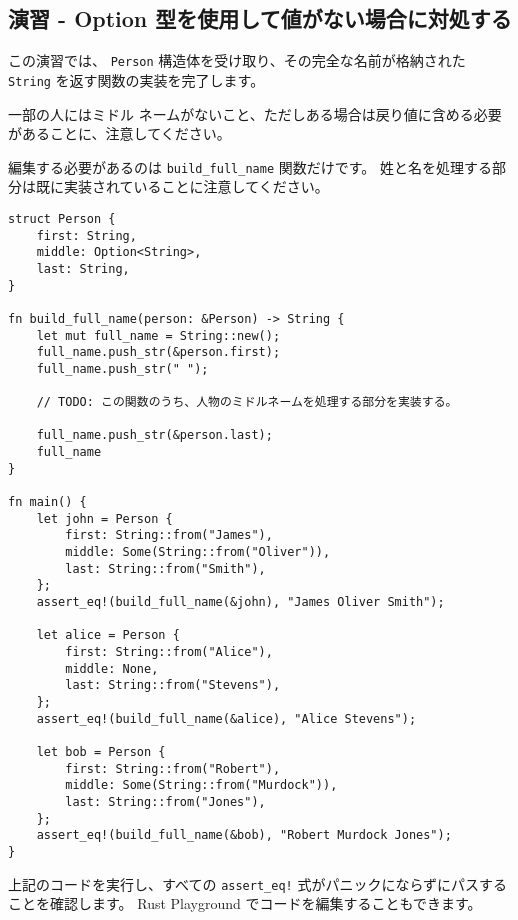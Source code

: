 \subsection{演習 - Option 型を使用して値がない場合に対処する}

この演習では、 \texttt{Person} 構造体を受け取り、その完全な名前が格納された \texttt{String} を返す関数の実装を完了します。

一部の人にはミドル ネームがないこと、ただしある場合は戻り値に含める必要があることに、注意してください。

編集する必要があるのは \texttt{build\_full\_name} 関数だけです。 姓と名を処理する部分は既に実装されていることに注意してください。

\begin{lstlisting}[numbers=none]
struct Person {
    first: String,
    middle: Option<String>,
    last: String,
}

fn build_full_name(person: &Person) -> String {
    let mut full_name = String::new();
    full_name.push_str(&person.first);
    full_name.push_str(" ");

    // TODO: この関数のうち、人物のミドルネームを処理する部分を実装する。

    full_name.push_str(&person.last);
    full_name
}

fn main() {
    let john = Person {
        first: String::from("James"),
        middle: Some(String::from("Oliver")),
        last: String::from("Smith"),
    };
    assert_eq!(build_full_name(&john), "James Oliver Smith");

    let alice = Person {
        first: String::from("Alice"),
        middle: None,
        last: String::from("Stevens"),
    };
    assert_eq!(build_full_name(&alice), "Alice Stevens");

    let bob = Person {
        first: String::from("Robert"),
        middle: Some(String::from("Murdock")),
        last: String::from("Jones"),
    };
    assert_eq!(build_full_name(&bob), "Robert Murdock Jones");
}
\end{lstlisting}


上記のコードを実行し、すべての \texttt{assert\_eq!} 式がパニックにならずにパスすることを確認します。 Rust Playground でコードを編集することもできます。


